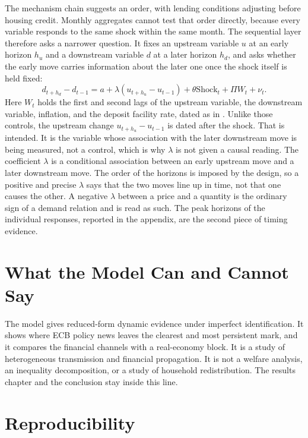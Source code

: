 The mechanism chain suggests an order, with lending conditions adjusting before housing credit. Monthly aggregates cannot test that order directly, because every variable responds to the same shock within the same month. The sequential layer therefore asks a narrower question. It fixes an upstream variable \(u\) at an early horizon \(h_u\) and a downstream variable \(d\) at a later horizon \(h_d\), and asks whether the early move carries information about the later one once the shock itself is held fixed:
\begin{equation}
  d_{t+h_d} - d_{t-1}
  =
  a
  + \lambda (u_{t+h_u} - u_{t-1})
  + \theta \mathrm{Shock}_{t}
  + \Pi W_t
  + \nu_t .
  \label{eq:sequential-timing}
\end{equation}
Here \(W_t\) holds the first and second lags of the upstream variable, the downstream variable, inflation, and the deposit facility rate, dated as in . Unlike those controls, the upstream change \(u_{t+h_u} - u_{t-1}\) is dated after the shock. That is intended. It is the variable whose association with the later downstream move is being measured, not a control, which is why \(\lambda\) is not given a causal reading. The coefficient \(\lambda\) is a conditional association between an early upstream move and a later downstream move. The order of the horizons is imposed by the design, so a positive and precise \(\lambda\) says that the two moves line up in time, not that one causes the other. A negative \(\lambda\) between a price and a quantity is the ordinary sign of a demand relation and is read as such. The peak horizons of the individual responses, reported in the appendix, are the second piece of timing evidence.

\section{What the Model Can and Cannot Say}

The model gives reduced-form dynamic evidence under imperfect identification. It shows where ECB policy news leaves the clearest and most persistent mark, and it compares the financial channels with a real-economy block. It is a study of heterogeneous transmission and financial propagation. It is not a welfare analysis, an inequality decomposition, or a study of household redistribution. The results chapter and the conclusion stay inside this line.

\section{Reproducibility}

